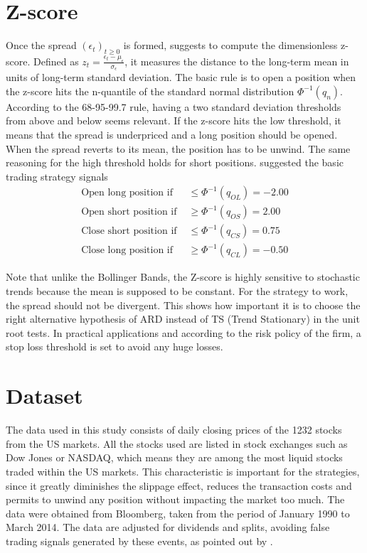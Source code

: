 \documentclass[11pt,a4,twosided,singlespacing,titlepagenumber=on]{scrreprt}
\numberwithin{equation}{chapter} %
\theoremstyle{remark}
\begin{document}
\section{Z-score}
Once the spread $(\epsilon_t)_{t \geq 0}$ is formed, \cite{caldeira2013} suggests to compute the dimensionless z-score. Defined as $z_t = \frac{\epsilon_t-\mu_\epsilon}{\sigma_\epsilon}$, it measures the distance to the long-term mean in units of long-term standard deviation. The basic rule is to open a position when the z-score hits the n-quantile of the standard normal distribution $\Phi^{-1}(q_n)$. According to the 68-95-99.7 rule, having a two standard deviation thresholds from above and below seems relevant. If the z-score hits the low threshold, it means that the spread is underpriced and a long position should be opened. When the spread reverts to its mean, the position has to be unwind. The same reasoning for the high threshold holds for short positions. \cite{caldeira2013} suggested the basic trading strategy signals
\begin{align*}
\text{Open long position if } &\leq \Phi^{-1}(q_{OL}) = -2.00\\
\text{Open short position if } &\geq \Phi^{-1}(q_{OS}) = 2.00\\
\text{Close short position if } &\leq \Phi^{-1}(q_{CS}) = 0.75\\
\text{Close long position if } &\geq \Phi^{-1}(q_{CL}) = -0.50
\end{align*}


Note that unlike the Bollinger Bands, the Z-score is highly sensitive to stochastic trends because the mean is supposed to be constant. For the strategy to work, the spread should not be divergent. This shows how important it is to choose the right alternative hypothesis of ARD instead of TS (Trend Stationary) in the unit root tests. In practical applications and according to the risk policy of the firm, a stop loss threshold is set to avoid any huge losses.

\section{Dataset}
The data used in this study consists of daily closing prices of the 1232 stocks from the US markets. All the stocks used are listed in stock exchanges such as Dow Jones or NASDAQ, which means they are among the most liquid stocks traded within the US markets. This characteristic is important for the strategies, since it greatly diminishes the slippage effect, reduces the transaction costs and permits to unwind any position without impacting the market too much. The data were obtained from Bloomberg, taken from the period of January 1990 to March 2014. The data are adjusted for dividends and splits, avoiding false trading signals generated by these events, as pointed out by \cite{broussard2012}.
\end{document}
